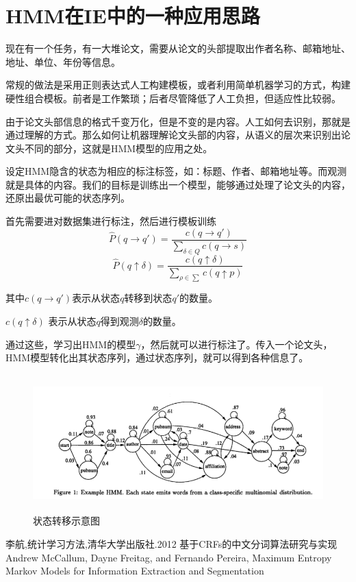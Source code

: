 \documentclass[a4paper]{ctexart}
\begin{document}
\section{HMM在IE中的一种应用思路}
\par 现在有一个任务，有一大堆论文，需要从论文的头部提取出作者名称、邮箱地址、地址、单位、年份等信息。
\par 常规的做法是采用正则表达式人工构建模板，或者利用简单机器学习的方式，构建硬性组合模板。前者是工作繁琐；后者尽管降低了人工负担，但适应性比较弱。
\par 由于论文头部信息的格式千变万化，但是不变的是内容。人工如何去识别，那就是通过理解的方式。那么如何让机器理解论文头部的内容，从语义的层次来识别出论文头不同的部分，这就是HMM模型的应用之处。
\par 设定HMM隐含的状态为相应的标注标签，如：标题、作者、邮箱地址等。而观测就是具体的内容。我们的目标是训练出一个模型，能够通过处理了论文头的内容，还原出最优可能的状态序列。
\par 首先需要进对数据集进行标注，然后进行模板训练
\begin{equation}
    \hat{P}(q \rightarrow q') = 
        \frac{c(q \rightarrow q')} {\sum_{\delta \in Q}c(q \rightarrow s)}
\end{equation}
\begin{equation}
    \hat{P}(q \uparrow \delta) = 
        \frac{c(q \uparrow \delta)}
        {\sum_{\rho \in \sum}c(q \uparrow p)}
\end{equation}
\par 其中$c(q \rightarrow q')$表示从状态$q$转移到状态$q'$的数量。
\par $c(q \uparrow \delta)$ 表示从状态$q$得到观测$\delta$的数量。
\par 通过这些，学习出HMM的模型$\gamma$，然后就可以进行标注了。传入一个论文头，HMM模型转化出其状态序列，通过状态序列，就可以得到各种信息了。

\begin{figure}[]
    \centering
    \includegraphics[height=150pt]{hmm.png}
    \caption{状态转移示意图}
    \label{fig:hmm}
\end{figure}

\begin{thebibliography}{sotief}
         李航,统计学习方法,清华大学出版社.2012
        基于CRFs的中文分词算法研究与实现
         Andrew McCallum, Dayne Freitag, and Fernando Pereira, Maximum Entropy Markov Models for Information Extraction and Segmentation
\end{thebibliography}
\end{document}
